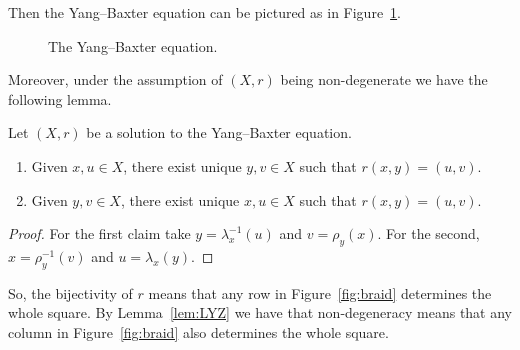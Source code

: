     Then the Yang--Baxter equation can be pictured as in Figure~\ref{fig:YangBaxter}.

    \begin{figure}
        \centering
        \hspace{.5cm}
        \caption{The Yang--Baxter equation.}
        \label{fig:YangBaxter}
    \end{figure}

    Moreover, under the assumption of $(X,r)$ being non-degenerate we have the following lemma. 
    
    \begin{lemma}
    \label{lem:LYZ}
        Let $(X,r)$ be a solution to the Yang--Baxter equation. 
        \begin{enumerate}
            \item Given $x,u\in X$, there exist unique $y,v\in X$ such that $r(x,y)=(u,v)$. 
            \item Given $y,v\in X$, there exist unique $x,u\in X$ such that $r(x,y)=(u,v)$. 
        \end{enumerate}
    \end{lemma}
    \begin{proof}
        For the first claim take $y=\lambda_x^{-1}(u)$ and $v=\rho_y(x)$. 
        For the second, $x=\rho_y^{-1}(v)$ and $u=\lambda_x(y)$. 
    \end{proof}

    So, the bijectivity of $r$ means that any row in Figure~\ref{fig:braid} determines the whole square. By Lemma~\ref{lem:LYZ} we have that non-degeneracy means that any column in Figure~\ref{fig:braid} also determines the whole square. 

